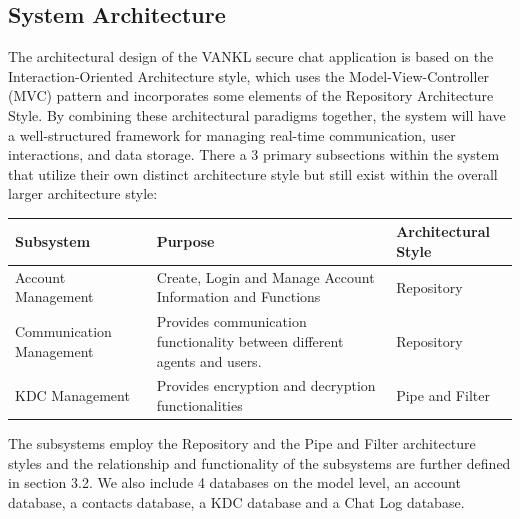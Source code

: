 \documentclass[]{article}
\begin{document}
\subsection{System Architecture}
\label{sub:system_architecture}
The architectural design of the VANKL secure chat application is based on the Interaction-Oriented Architecture style, which uses the Model-View-Controller (MVC) pattern and incorporates some elements of the Repository Architecture Style. By combining these architectural paradigms together, the system will have a well-structured framework for managing real-time communication, user interactions, and data storage.
\newline\newline
There a 3 primary subsections within the system that utilize their own distinct architecture style but still exist within the overall larger architecture style:
\begin{center}
	\begin{tabular}{|p{2in} | p{2in}| p{2in}|}
		\hline
		Subsystem                & Purpose                                                                  & Architectural Style \\
		\hline
		Account Management       & Create, Login and Manage Account Information and Functions               & Repository          \\
		\hline
		Communication Management & Provides communication functionality between different agents and users. & Repository          \\
		\hline
		KDC Management           & Provides encryption and decryption functionalities                       & Pipe and Filter     \\
		\hline
	\end{tabular}
\end{center}
The subsystems employ the Repository and the Pipe and Filter architecture styles and the relationship and functionality of the subsystems are further defined in section 3.2.
\newline
\newline
We also include 4 databases on the model level, an account database, a contacts database, a KDC database and a Chat Log database.
\newline
\newline
\end{document}

